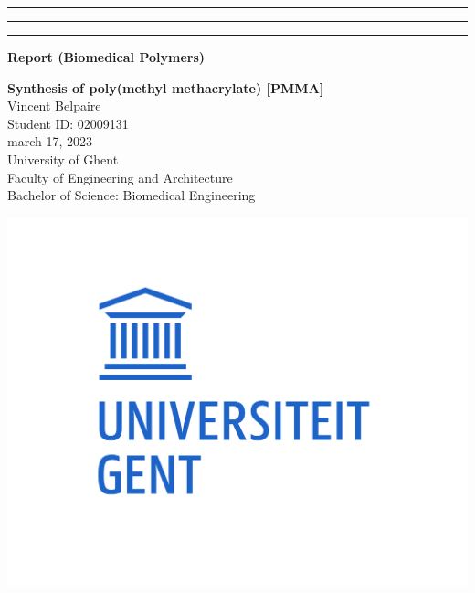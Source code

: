 {\color{ugent_blue} \hrule\hrule\hrule}

\vspace*{-0.43mm}
\colorbox{ugent_blue}{\color{white} \bf Report (Biomedical Polymers)}\\

\noindent\begin{minipage}{0.7\textwidth}%
{\LARGE \bf \color{ugent_blue} Synthesis of poly(methyl methacrylate) [PMMA]}\\[2mm]

%
{\large Vincent Belpaire}\\
{Student ID: 02009131}\\
march 17, 2023\\


{\small University of Ghent}\\
{\small Faculty of Engineering and Architecture}\\
{\small Bachelor of Science: Biomedical Engineering}\\
\end{minipage}%
\hfill%
\begin{minipage}{0.3\textwidth}
\vspace{-2.2cm}
\begin{center}
\includegraphics[width=\linewidth]{ugent_logo}
\end{center}
\end{minipage}\\